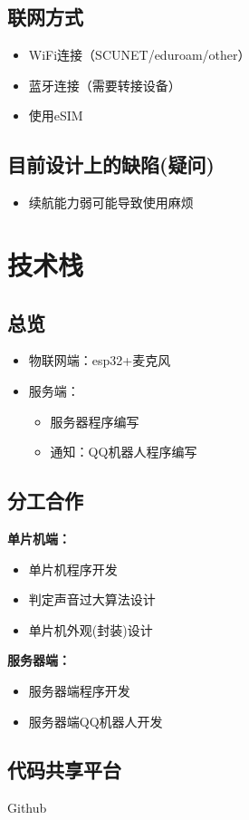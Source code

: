 \documentclass[12pt, a4paper, oneside]{ctexart}
\begin{document}
\subsection{联网方式}
\begin{itemize}
    \item WiFi连接（SCUNET/eduroam/other）
    \item 蓝牙连接（需要转接设备）
    \item 使用eSIM
\end{itemize}

\subsection{目前设计上的缺陷(疑问)}
\begin{itemize}
    \item 续航能力弱可能导致使用麻烦
\end{itemize}


\section{技术栈}
\subsection{总览}
\begin{itemize}
    \item 物联网端：esp32+麦克风
    \item 服务端：
    \begin{itemize}
        \item 服务器程序编写
        \item 通知：QQ机器人程序编写
    \end{itemize}

\end{itemize}

\subsection{分工合作}

\textbf{单片机端：}
\begin{itemize}
    
    \item 单片机程序开发
    \item 判定声音过大算法设计
    \item 单片机外观(封装)设计
\end{itemize}

\textbf{服务器端：}

\begin{itemize}
    \item 服务器端程序开发
    \item 服务器端QQ机器人开发
    
\end{itemize}

\subsection{代码共享平台} 
Github 
\end{document}
